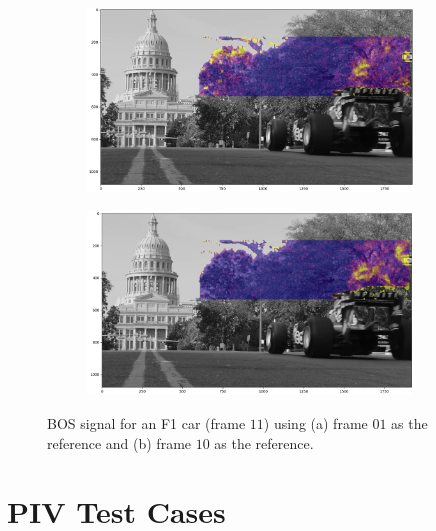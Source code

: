 \documentclass[letterpaper,12pt]{article}
\begin{document}
\begin{figure}[h]
    \centering
    \begin{subfigure}[b]{0.45\textwidth}
    	\centering
        \includegraphics[width=0.95\textwidth]{F1_Car_Frame_11_01.PNG}
        \caption{}
        \label{fig:F1_Car_Frame_11_01}
    \end{subfigure}
    \begin{subfigure}[b]{0.45\textwidth}
    	\centering
        \includegraphics[width=0.95\textwidth]{F1_Car_Frame_11_10.PNG}
        \caption{}
        \label{fig:F1_Car_Frame_11_10}
    \end{subfigure}

    \caption{BOS signal for an F1 car (frame $11$) using (a) frame $01$ as the reference and (b) frame $10$ as the reference.}
    \label{fig:F1_Car}
\end{figure}

\section{PIV Test Cases}
\label{sec:PIV_Test_Cases}
\end{document}
